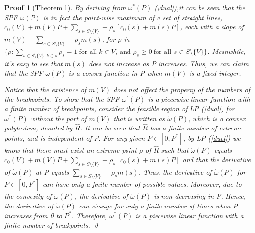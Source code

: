\documentclass[UTF8]{article}
\newtheorem{pf}{\hspace{2em}Proof}
\begin{document}
\begin{pf}[Theorem 1]

By deriving from $\omega^* (P)$ (\ref{dual}),it can be seen that the SPF $\omega(P)$ is in fact the point-wise maximum of a set of straight lines, $c_0(V)+m(V)P+\sum_{s\in S\setminus\{V\}}-\rho_s[c_0(s)+m(s)P]$, each with a slope of $m(V)+\sum_{s\in S\setminus\{V\}} −\rho_s m(s)$, for $\rho$ in $\{\rho :\sum_{s\in S\setminus \{V\}:k\in s} \rho_s=1\  \text{for all }  k\in V,\ \text{and } \rho_s \geq 0\ \text{for all } s\in S\setminus \{V\} \}$.
Meanwhile, it's easy to see that $m(s)$ does not increase as P increases. Thus, we can claim that the SPF $\omega(P)$ is a convex function in P when $m(V)$ is a fixed integer.

Notice that the existence of $m(V)$ does not affect the property of the numbers of the breakpoints.
To show that the SPF $\omega^* (P)$ is a piecewise linear function with a ﬁnite number of breakpoints, consider the feasible region of LP (\ref{dual}) for $\omega^* (P)$ without the part of $m(V)$ that is written as $\acute{\omega} (P)$, which is a convex polyhedron, denoted by $\hat{R}$. It can be seen that $\hat{R}$ has a ﬁnite number of extreme points, and is independent of P. For any given $P \in [0,P^*]$, by LP (\ref{dual}) we know that there must exist an extreme point $\rho$ of $\hat{R}$ such that $\acute{\omega} (P)$ equals
$c_0(V)+m(V)P+\sum_{s\in S\setminus\{V\}}-\rho_s[c_0(s)+m(s)P]$
and that the derivative of $\acute{\omega} (P)$ at P equals $\sum_{s\in S\setminus\{V\}} −\rho_s m(s)$. Thus, the derivative of $\acute{\omega} (P)$ for $P \in [0,P^*]$ can have only a ﬁnite number of possible values. Moreover, due to the convexity of $\acute{\omega} (P)$, the derivative of $\acute{\omega} (P)$ is non-decreasing in P. Hence, the derivative of $\acute{\omega} (P)$ can change for only a ﬁnite number of times when P increases from 0 to $P^*$. Therefore, $\omega^* (P)$ is a piecewise linear function with a ﬁnite number of breakpoints.
\qed
\end{pf}
\end{document}
